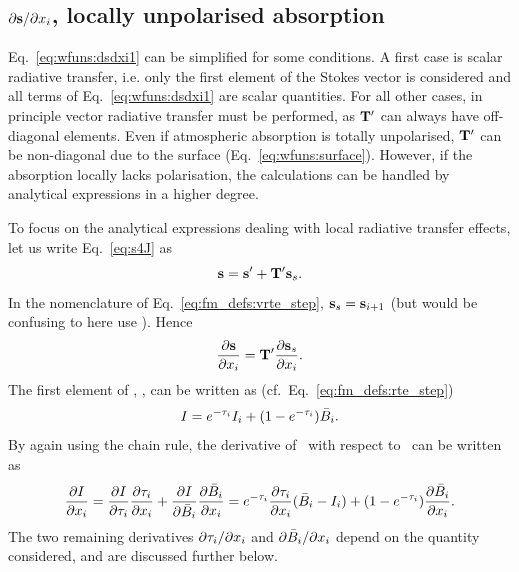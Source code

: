 \subsection{$\partial{\bf s}/\partial x_{i}$, locally unpolarised absorption}
\label{sec:wfuns:atmvars:unpol}
%
Eq.~\ref{eq:wfuns:dsdxi1} can be simplified for some conditions. A first case
is scalar radiative transfer, i.e. only the first element of the Stokes vector
is considered and all terms of Eq.~\ref{eq:wfuns:dsdxi1} are scalar quantities.
For all other cases, in principle vector radiative transfer must be performed,
as $\mathbf{T}'$ can always have off-diagonal elements. Even if atmospheric
absorption is totally unpolarised, $\mathbf{T}'$ can be non-diagonal due to the
surface (Eq.~\ref{eq:wfuns:surface}). However, if the absorption locally lacks
polarisation, the calculations can be handled by analytical expressions in a
higher degree.

To focus on the analytical expressions dealing with local radiative transfer
effects, let us write Eq.~\ref{eq:s4J} as
\begin{equation}
  {\bf s} = {\bf s}' + \mathbf{T}'{\bf s}_{s}.
\end{equation}
In the nomenclature of Eq.~\ref{eq:fm_defs:vrte_step},
${\bf s}_{s}={\bf s}_{i+1}$ (but would be confusing to here use ).
Hence
\begin{displaymath}
  \frac{\partial{\bf s}}{\partial x_{i}} = \mathbf{T}'
    \frac{\partial{\bf s}_{s}}{\partial x_{i}}.
\end{displaymath}
The first element of , \StoI, can be written as (cf.\
Eq.~\ref{eq:fm_defs:rte_step})
\begin{equation}
  \label{eq:I4J}
  I = e^{-\tau_{i}}I_{i} + (1-e^{-\tau_{i}})\bar{B}_i.
\end{equation}
By again using the chain rule, the derivative of \StoI\ with respect to
\aSttElm{i}\ can be written as
\begin{equation}
  \frac{\partial I}{\partial x_{i}} =
  \frac{\partial I}{\partial\tau_{i}}\frac{\partial\tau_{i}}{\partial x_{i}} + 
  \frac{\partial I}{\partial\bar{B}_i}
  \frac{\partial\bar{B}_i}{\partial x_{i}} = 
   e^{-\tau_{i}}\frac{\partial\tau_{i}}{\partial x_{i}}
      (\bar{B}_i-I_{i}) +
  (1-e^{-\tau_{i}})\frac{\partial\bar{B}_i}{\partial x_{i}}.
  \label{eq:wfuns:dsdxi2}
\end{equation}
The two remaining derivatives $\partial\tau_{i}/\partial x_{i}$ and
$\partial\bar{B}_i/\partial x_{i}$
depend on the quantity considered, and are discussed further below.

